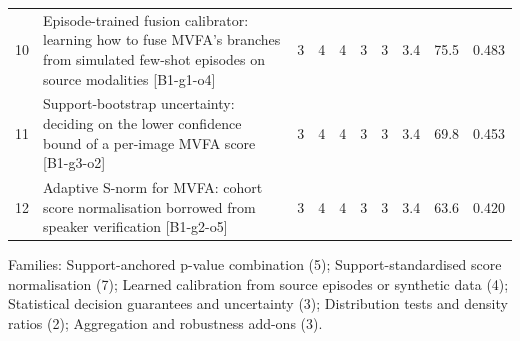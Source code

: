 \documentclass[11pt,a4paper]{article}
\begin{document}
{\begin{longtable}{@{}r >{\raggedright\arraybackslash}p{8.4cm} ccccc c r r@{}}
10 & Episode-trained fusion calibrator: learning how to fuse MVFA's branches from simulated few-shot episodes on source modalities {\footnotesize\color{muted}[B1-g1-o4]} & 3 & 4 & 4 & 3 & 3 & 3.4 & 75.5 & 0.483\\
11 & Support-bootstrap uncertainty: deciding on the lower confidence bound of a per-image MVFA score {\footnotesize\color{muted}[B1-g3-o2]} & 3 & 4 & 4 & 3 & 3 & 3.4 & 69.8 & 0.453\\
12 & Adaptive S-norm for MVFA: cohort score normalisation borrowed from speaker verification {\footnotesize\color{muted}[B1-g2-o5]} & 3 & 4 & 4 & 3 & 3 & 3.4 & 63.6 & 0.420\\
\bottomrule
\end{longtable}}
{\small Families: Support-anchored p-value combination (5); Support-standardised score normalisation (7); Learned calibration from source episodes or synthetic data (4); Statistical decision guarantees and uncertainty (3); Distribution tests and density ratios (2); Aggregation and robustness add-ons (3).}
\end{document}
